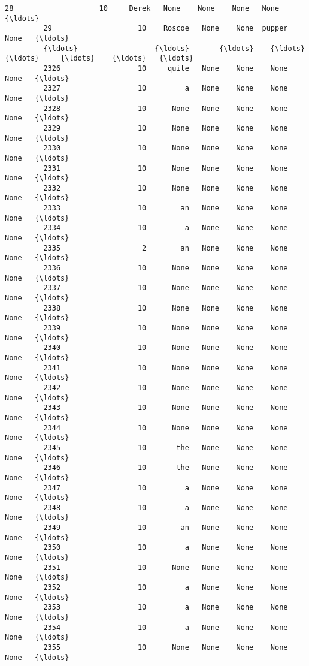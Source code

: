 \documentclass[11pt]{article}
\begin{document}
\begin{Verbatim}[commandchars=\\\{\}]
         28                    10     Derek   None    None    None   None   {\ldots}     
         29                    10    Roscoe   None    None  pupper   None   {\ldots}     
         {\ldots}                  {\ldots}       {\ldots}    {\ldots}     {\ldots}     {\ldots}    {\ldots}   {\ldots}     
         2326                  10     quite   None    None    None   None   {\ldots}     
         2327                  10         a   None    None    None   None   {\ldots}     
         2328                  10      None   None    None    None   None   {\ldots}     
         2329                  10      None   None    None    None   None   {\ldots}     
         2330                  10      None   None    None    None   None   {\ldots}     
         2331                  10      None   None    None    None   None   {\ldots}     
         2332                  10      None   None    None    None   None   {\ldots}     
         2333                  10        an   None    None    None   None   {\ldots}     
         2334                  10         a   None    None    None   None   {\ldots}     
         2335                   2        an   None    None    None   None   {\ldots}     
         2336                  10      None   None    None    None   None   {\ldots}     
         2337                  10      None   None    None    None   None   {\ldots}     
         2338                  10      None   None    None    None   None   {\ldots}     
         2339                  10      None   None    None    None   None   {\ldots}     
         2340                  10      None   None    None    None   None   {\ldots}     
         2341                  10      None   None    None    None   None   {\ldots}     
         2342                  10      None   None    None    None   None   {\ldots}     
         2343                  10      None   None    None    None   None   {\ldots}     
         2344                  10      None   None    None    None   None   {\ldots}     
         2345                  10       the   None    None    None   None   {\ldots}     
         2346                  10       the   None    None    None   None   {\ldots}     
         2347                  10         a   None    None    None   None   {\ldots}     
         2348                  10         a   None    None    None   None   {\ldots}     
         2349                  10        an   None    None    None   None   {\ldots}     
         2350                  10         a   None    None    None   None   {\ldots}     
         2351                  10      None   None    None    None   None   {\ldots}     
         2352                  10         a   None    None    None   None   {\ldots}     
         2353                  10         a   None    None    None   None   {\ldots}     
         2354                  10         a   None    None    None   None   {\ldots}     
         2355                  10      None   None    None    None   None   {\ldots}     
         

\end{Verbatim}
\end{document}
